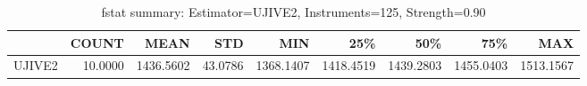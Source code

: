 \begin{table}[ht]
\centering
\caption{fstat summary: Estimator=UJIVE2, Instruments=125, Strength=0.90}
\begin{tabular}{lrrrrrrrr}
\toprule
 & COUNT & MEAN & STD & MIN & 25\% & 50\% & 75\% & MAX \\
\midrule
UJIVE2 & 10.0000 & 1436.5602 & 43.0786 & 1368.1407 & 1418.4519 & 1439.2803 & 1455.0403 & 1513.1567 \\
\bottomrule
\end{tabular}
\end{table}
